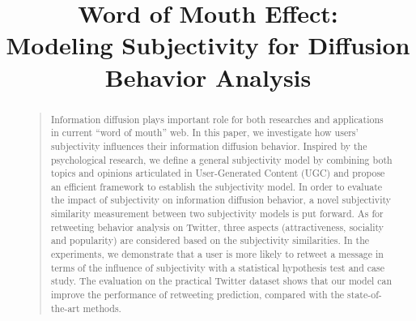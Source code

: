 \documentclass[letterpaper]{article}
\begin{document}
%
\title{Word of Mouth Effect: \\Modeling Subjectivity for Diffusion Behavior Analysis}
\nocopyright
\maketitle
\begin{abstract}
\begin{quote}
Information diffusion plays important role for both researches and applications in current ``word of mouth'' web. In this paper, we investigate how users' subjectivity influences their information diffusion behavior. 
Inspired by the psychological research, we define a general subjectivity model by combining both topics and opinions articulated in User-Generated Content (UGC) and propose an efficient framework to establish the subjectivity model. 
In order to evaluate the impact of subjectivity on information diffusion behavior, a novel subjectivity similarity measurement between two subjectivity models is put forward. As for retweeting behavior analysis on Twitter, three aspects (attractiveness, sociality and popularity) are considered based on the subjectivity similarities. In the experiments, we demonstrate that a user is more likely to retweet a message in terms of the influence of subjectivity with a statistical hypothesis test and case study. The evaluation on the practical Twitter dataset shows that our  model can improve the performance of retweeting prediction, compared with the state-of-the-art methods.
\end{quote}
\end{abstract}
\end{document}
